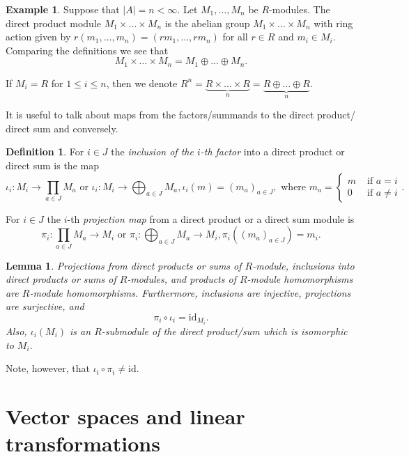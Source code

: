\documentclass[12pt]{report}
\newtheorem{lemma}[theorem]{Lemma}
\numberwithin{equation}{section}
\numberwithin{theorem}{chapter}
\theoremstyle{definition}
\newtheorem{definition}[theorem]{Definition}
\newtheorem{example}[theorem]{Example}
\newtheorem*{basic properties}{Basic Properties}
\newtheorem*{Important Remark}{Important Remark}
\begin{document}
\begin{example}
Suppose that $|A| = n < \infty$. Let $M_1,\ldots,M_n$ be $R$-modules. The direct product module $M_1 \times \dots \times M_n$ is the abelian group $M_1 \times \dots \times M_n$ with ring action given by $r(m_1,\ldots,m_n) = (rm_1,\ldots,rm_n)$ for all $r \in R$ and $m_i \in M_i$.  Comparing the definitions we see  that
$$M_1 \times \dots \times M_n = M_1 \oplus \dots \oplus M_n.$$

If $M_i=R$ for $1 \leqslant i \leqslant n$, then we denote $R^n = \underbrace{R\times  \dots \times R}_n=\underbrace{R\oplus  \dots \oplus R}_n$.
\end{example}

It is useful to talk about maps from the factors/summands to the direct product/ direct sum and conversely.

\begin{definition}
For $i\in J$ the {\em inclusion of the $i$-th factor} into a direct product or direct sum is the map
$$\iota_i\!: M_i \to \prod_{a \in J} M_a \text{ or } \iota_i\!: M_i \to \bigoplus_{a \in J} M_a, \iota_i(m)=(m_a)_{a \in J}, \text{ where } m_a=\begin{cases} m & \text{ if } a = i \\ 0 & \text{ if } a \neq i \end{cases}.$$


\noindent For $i\in J$ the $i$-th {\em projection map} from a direct product or a direct sum module is 
$$\pi_i\!: \prod_{a \in J} M_a \to M_i \text{ or } \pi_i:\bigoplus_{a \in J} M_a \to M_i, \pi_i \left((m_a)_{a \in J}\right)=m_i.$$
\end{definition}


\begin{lemma}
Projections from direct products or sums of $R$-module, inclusions into direct products or sums of $R$-modules, and products of $R$-module homomorphisms are $R$-module homomorphisms. Furthermore, inclusions are injective, projections are surjective, and 
$$\pi_i\circ \iota_i=\mathrm{id}_{M_i}.$$
Also, $\iota_i(M_i)$ is an $R$-submodule of the direct product/sum which is isomorphic to $M_i$.
\end{lemma}


Note, however, that $\iota_i\circ\pi_i\neq \mathrm{id}$.





\chapter{Vector spaces and linear transformations}
\end{document}
